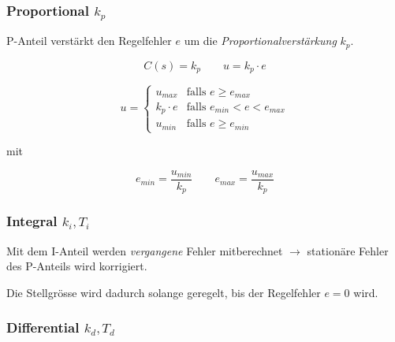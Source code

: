 \documentclass[
  10pt,
  a4paper,
  twocolumn]{article}
\numberwithin{equation}{section}
\begin{document}
\subsubsection{\texorpdfstring{\textcolor{BrickRed}{Proportional}
\(k_p\)}{ k\_p}}\label{k_p}

P-Anteil verstärkt den Regelfehler \(e\) um die
\emph{Proportionalverstärkung} \(k_p\).

\[
C(s) = k_p \qquad u = k_p\cdot e
\]

\begin{tcolorbox}[enhanced jigsaw, coltitle=black, colback=white, breakable, colframe=quarto-callout-important-color-frame, rightrule=.15mm, left=2mm, opacityback=0, leftrule=.75mm, toptitle=1mm, colbacktitle=quarto-callout-important-color!10!white, bottomtitle=1mm, arc=.35mm, bottomrule=.15mm, title=\textcolor{quarto-callout-important-color}{\faExclamation}\hspace{0.5em}{Proportionalband}, titlerule=0mm, toprule=.15mm, opacitybacktitle=0.6]

\[
u = \left\{
\begin{array}{cl}
u_{max} & \text{falls } e \geq e_{max} \\
k_p\cdot e & \text{falls } e_{min} < e < e_{max} \\
u_{min} & \text{falls } e \geq e_{min}
\end{array}
\right.
\]

mit

\[
e_{min}=\frac{u_{min}}{k_p} \qquad e_{max}=\frac{u_{max}}{k_p}
\]

\end{tcolorbox}

\subsubsection{\texorpdfstring{\textcolor{NavyBlue}{Integral}
\(k_i,T_i\)}{ k\_i,T\_i}}\label{k_it_i}

Mit dem I-Anteil werden \emph{vergangene} Fehler mitberechnet
\(\rightarrow\) stationäre Fehler des P-Anteils wird korrigiert.

Die Stellgrösse wird dadurch solange geregelt, bis der Regelfehler
\(e=0\) wird.

\subsubsection{\texorpdfstring{\textcolor{OliveGreen}{Differential}
\(k_d,T_d\)}{ k\_d,T\_d}}\label{k_dt_d}
\end{document}
